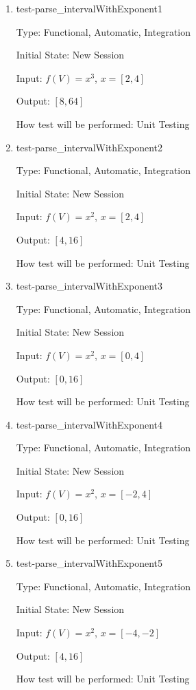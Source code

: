 \documentclass[12pt, titlepage]{article}
\begin{document}
\begin{enumerate}
	
	\item{test-parse\_intervalWithExponent1}
	
	Type: Functional, Automatic, Integration
	
	Initial State: New Session
	
	Input: $f(V) = x^3$, $x = [2,4]$
	
	Output: $[8,64]$
	
	How test will be performed: Unit Testing\\
	
	\item{test-parse\_intervalWithExponent2}
	
	Type: Functional, Automatic, Integration
	
	Initial State: New Session
	
	Input: $f(V) = x^2$, $x = [2,4]$
	
	Output: $[4,16]$
	
	How test will be performed: Unit Testing\\
	
	\item{test-parse\_intervalWithExponent3}
	
	Type: Functional, Automatic, Integration
	
	Initial State: New Session
	
	Input: $f(V) = x^2$, $x = [0,4]$
	
	Output: $[0,16]$
	
	How test will be performed: Unit Testing\\
	
	\item{test-parse\_intervalWithExponent4}
	
	Type: Functional, Automatic, Integration
	
	Initial State: New Session
	
	Input: $f(V) = x^2$, $x = [-2,4]$
	
	Output: $[0,16]$
	
	How test will be performed: Unit Testing\\
	
	\item{test-parse\_intervalWithExponent5}
	
	Type: Functional, Automatic, Integration
	
	Initial State: New Session
	
	Input: $f(V) = x^2$, $x = [-4,-2]$
	
	Output: $[4,16]$
	
	How test will be performed: Unit Testing\\
	
\end{enumerate}
\end{document}
